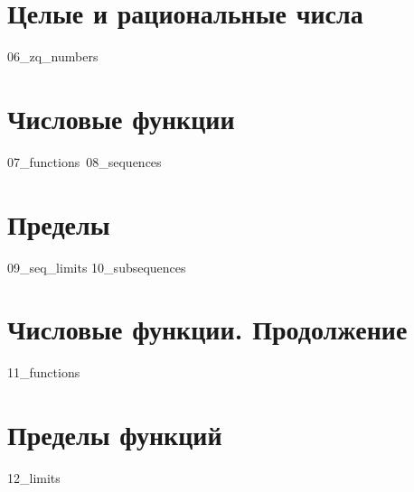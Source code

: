 \documentclass[a4paper,12pt]{article}
\begin{document}
  \section{Целые и рациональные числа}
  {06_zq_numbers}

  \section{Числовые функции}
  {07_functions}\
  {08_sequences}

  \section{Пределы}
  {09_seq_limits}
  {10_subsequences}

  \section{Числовые функции. Продолжение}
  {11_functions}

  \section{Пределы функций}
  {12_limits}
\end{document}
